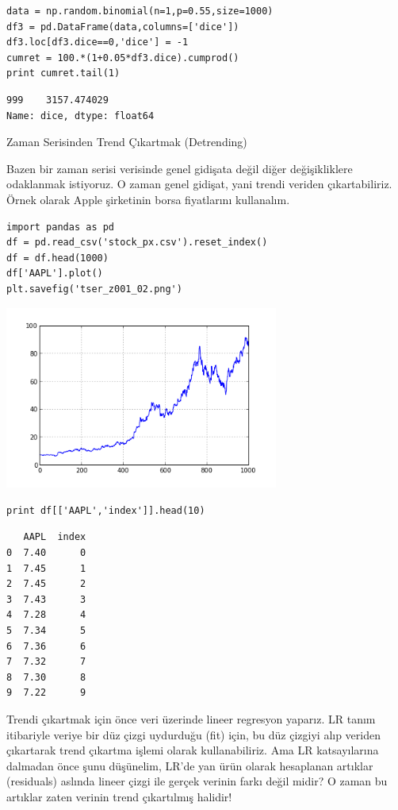 \documentclass[12pt,fleqn]{article}\usepackage{../../common}
\begin{document}
\begin{verbatim}
data = np.random.binomial(n=1,p=0.55,size=1000)
df3 = pd.DataFrame(data,columns=['dice'])
df3.loc[df3.dice==0,'dice'] = -1
cumret = 100.*(1+0.05*df3.dice).cumprod()
print cumret.tail(1)
\end{verbatim}

\begin{verbatim}
999    3157.474029
Name: dice, dtype: float64
\end{verbatim}

\newpage

Zaman Serisinden Trend Çıkartmak (Detrending)

Bazen bir zaman serisi verisinde genel gidişata değil diğer değişikliklere
odaklanmak istiyoruz. O zaman genel gidişat, yani trendi veriden
çıkartabiliriz. Örnek olarak Apple şirketinin borsa fiyatlarını kullanalım.

\begin{verbatim}
import pandas as pd
df = pd.read_csv('stock_px.csv').reset_index()
df = df.head(1000)
df['AAPL'].plot()
plt.savefig('tser_z001_02.png')
\end{verbatim}

\includegraphics[height=6cm]{tser_z001_02.png}

\begin{verbatim}
print df[['AAPL','index']].head(10)
\end{verbatim}

\begin{verbatim}
   AAPL  index
0  7.40      0
1  7.45      1
2  7.45      2
3  7.43      3
4  7.28      4
5  7.34      5
6  7.36      6
7  7.32      7
8  7.30      8
9  7.22      9
\end{verbatim}

Trendi çıkartmak için önce veri üzerinde lineer regresyon yaparız. LR tanım
itibariyle veriye bir düz çizgi uydurduğu (fit) için, bu düz çizgiyi alıp
veriden çıkartarak trend çıkartma işlemi olarak kullanabiliriz. Ama LR
katsayılarına dalmadan önce şunu düşünelim, LR'de yan ürün olarak
hesaplanan artıklar (residuals) aslında lineer çizgi ile gerçek verinin
farkı değil midir? O zaman bu artıklar zaten verinin trend çıkartılmış
halidir!
\end{document}
